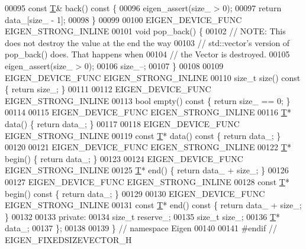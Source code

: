 \begin{DoxyCode}
00095   \textcolor{keyword}{const} \hyperlink{group___sparse_core___module_class_eigen_1_1_triplet}{T}& back()\textcolor{keyword}{ const }\{
00096     eigen\_assert(size\_ > 0);
00097     \textcolor{keywordflow}{return} data\_[size\_ - 1];
00098   \}
00099 
00100   EIGEN\_DEVICE\_FUNC EIGEN\_STRONG\_INLINE
00101   \textcolor{keywordtype}{void} pop\_back() \{
00102     \textcolor{comment}{// NOTE: This does not destroy the value at the end the way}
00103     \textcolor{comment}{// std::vector's version of pop\_back() does.  That happens when}
00104     \textcolor{comment}{// the Vector is destroyed.}
00105     eigen\_assert(size\_ > 0);
00106     size\_--;
00107   \}
00108 
00109   EIGEN\_DEVICE\_FUNC EIGEN\_STRONG\_INLINE
00110   \textcolor{keywordtype}{size\_t} size()\textcolor{keyword}{ const }\{ \textcolor{keywordflow}{return} size\_; \}
00111 
00112   EIGEN\_DEVICE\_FUNC EIGEN\_STRONG\_INLINE
00113   \textcolor{keywordtype}{bool} empty()\textcolor{keyword}{ const }\{ \textcolor{keywordflow}{return} size\_ == 0; \}
00114 
00115   EIGEN\_DEVICE\_FUNC EIGEN\_STRONG\_INLINE
00116   \hyperlink{group___sparse_core___module_class_eigen_1_1_triplet}{T}* data() \{ \textcolor{keywordflow}{return} data\_; \}
00117 
00118   EIGEN\_DEVICE\_FUNC EIGEN\_STRONG\_INLINE
00119   \textcolor{keyword}{const} \hyperlink{group___sparse_core___module_class_eigen_1_1_triplet}{T}* data()\textcolor{keyword}{ const }\{ \textcolor{keywordflow}{return} data\_; \}
00120 
00121   EIGEN\_DEVICE\_FUNC EIGEN\_STRONG\_INLINE
00122   \hyperlink{group___sparse_core___module_class_eigen_1_1_triplet}{T}* begin() \{ \textcolor{keywordflow}{return} data\_; \}
00123 
00124   EIGEN\_DEVICE\_FUNC EIGEN\_STRONG\_INLINE
00125   \hyperlink{group___sparse_core___module_class_eigen_1_1_triplet}{T}* end() \{ \textcolor{keywordflow}{return} data\_ + size\_; \}
00126 
00127   EIGEN\_DEVICE\_FUNC EIGEN\_STRONG\_INLINE
00128   \textcolor{keyword}{const} \hyperlink{group___sparse_core___module_class_eigen_1_1_triplet}{T}* begin()\textcolor{keyword}{ const }\{ \textcolor{keywordflow}{return} data\_; \}
00129 
00130   EIGEN\_DEVICE\_FUNC EIGEN\_STRONG\_INLINE
00131   \textcolor{keyword}{const} \hyperlink{group___sparse_core___module_class_eigen_1_1_triplet}{T}* end()\textcolor{keyword}{ const }\{ \textcolor{keywordflow}{return} data\_ + size\_; \}
00132 
00133  \textcolor{keyword}{private}:
00134   \textcolor{keywordtype}{size\_t} reserve\_;
00135   \textcolor{keywordtype}{size\_t} size\_;
00136   \hyperlink{group___sparse_core___module_class_eigen_1_1_triplet}{T}* data\_;
00137 \};
00138 
00139 \}  \textcolor{comment}{// namespace Eigen}
00140 
00141 \textcolor{preprocessor}{#endif  // EIGEN\_FIXEDSIZEVECTOR\_H}
\end{DoxyCode}
